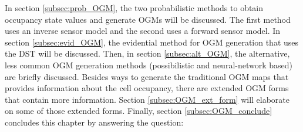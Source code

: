 \begin{table}[h!] 
	\caption{An overview of the properties of each \gls{OGM} generation method based on the examined literature in sections \ref{subsec:prob_OGM}, \ref{subsec:evid_OGM}, and \ref{subsec:alt_OGM}.}
	\centering
	\label{tab:ogm_overview}
\end{table}

In section \ref{subsec:prob_OGM}, the two probabilistic methods to obtain occupancy state values and generate \glspl{OGM} will be discussed. The first method uses an inverse sensor model and the second uses a forward sensor model. In section \ref{subsec:evid_OGM}, the evidential method for \gls{OGM} generation that uses the \gls{DST} will be discussed. Then, in section \ref{subsec:alt_OGM}, the alternative, less common \gls{OGM} generation methods (possibilistic and neural-network based) are briefly discussed.
Besides ways to generate the traditional \gls{OGM} maps that provides information about the cell occupancy, there are extended \gls{OGM} forms that contain more information. Section \ref{subsec:OGM_ext_form} will elaborate on some of those extended forms. Finally, section \ref{subsec:OGM_conclude} concludes this chapter by answering the question: 




